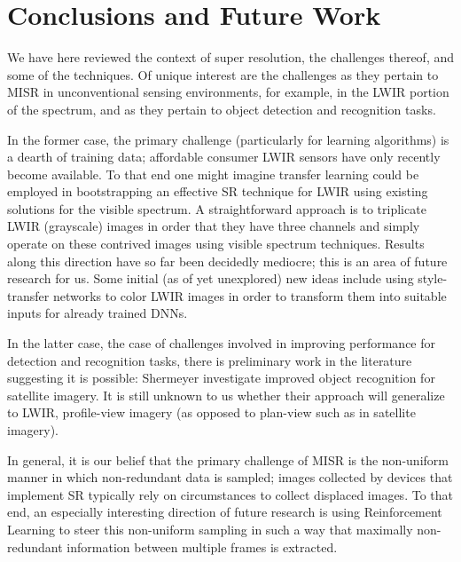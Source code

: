 \section{Conclusions and Future Work}\label{sec:conclusions}

We have here reviewed the context of super resolution, the challenges thereof, and some of the techniques.
%
Of unique interest are the challenges as they pertain to MISR in unconventional sensing environments, for example, in the LWIR portion of the spectrum, and as they pertain to object detection and recognition tasks.

In the former case, the primary challenge (particularly for learning algorithms) is a dearth of training data; affordable consumer LWIR sensors have only recently become available.
%
To that end one might imagine transfer learning could be employed in bootstrapping an effective SR technique for LWIR using existing solutions for the visible spectrum.
%
A straightforward approach is to triplicate LWIR (grayscale) images in order that they have three channels and simply operate on these contrived images using visible spectrum techniques.
%
Results along this direction have so far been decidedly mediocre; this is an area of future research for us.
%
Some initial (as of yet unexplored) new ideas include using style-transfer networks to color LWIR images in order to transform them into suitable inputs for already trained DNNs.

In the latter case, the case of challenges involved in improving performance for detection and recognition tasks, there is preliminary work in the literature suggesting it is possible: Shermeyer \etal \cite{effectssuperres} investigate improved object recognition for satellite imagery. It is still unknown to us whether their approach will generalize to LWIR, profile-view imagery (as opposed to plan-view such as in satellite imagery).

In general, it is our belief that the primary challenge of MISR is the non-uniform manner in which non-redundant data is sampled; images collected by devices that implement SR typically rely on circumstances to collect displaced images. To that end, an especially interesting direction of future research is using Reinforcement Learning to steer this non-uniform sampling in such a way that maximally non-redundant information between multiple frames is extracted.